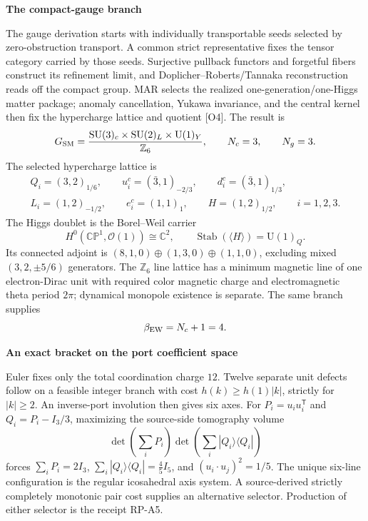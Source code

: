 \documentclass[10pt]{article}
\begin{document}
\vspace{0.14em}
{\bfseries\color{pragmaCyanText}The compact-gauge branch}\par

The gauge derivation starts with individually transportable seeds selected by
zero-obstruction transport. A common strict representative fixes the tensor
category carried by those seeds. Surjective pullback functors and forgetful
fibers construct its refinement limit, and Doplicher--Roberts/Tannaka
reconstruction reads off the compact group. MAR selects the realized
one-generation/one-Higgs matter package; anomaly cancellation, Yukawa
invariance, and the central kernel then fix the hypercharge lattice and quotient
[O4]. The result is
\[
  G_{\rm SM}
  =
  \frac{\mathrm{SU}(3)_c\times\mathrm{SU}(2)_L\times\mathrm{U}(1)_Y}
       {\mathbb Z_6},
  \qquad
  N_c=3,
  \qquad
  N_g=3.
\]
The selected hypercharge lattice is
\[
\begin{gathered}
  Q_i=(3,2)_{1/6},\qquad
  u_i^c=(\bar3,1)_{-2/3},\qquad
  d_i^c=(\bar3,1)_{1/3},\\
  L_i=(1,2)_{-1/2},\qquad
  e_i^c=(1,1)_1,\qquad
  H=(1,2)_{1/2},\qquad i=1,2,3.
\end{gathered}
\]
The Higgs doublet is the Borel--Weil carrier
\[
  H^0(\mathbb{CP}^1,\mathcal O(1))\cong\mathbb C^2,
  \qquad
  \operatorname{Stab}(\langle H\rangle)=\mathrm U(1)_Q.
\]
Its connected adjoint is
\((8,1,0)\oplus(1,3,0)\oplus(1,1,0)\),
excluding mixed \((3,2,\pm5/6)\) generators. The \(\mathbb Z_6\) line lattice
has a minimum magnetic line of one electron-Dirac unit with required color
magnetic charge and electromagnetic theta period \(2\pi\); dynamical monopole
existence is separate. The same branch supplies
\[
  \beta_{\rm EW}=N_c+1=4.
\]

\vspace{0.14em}
{\bfseries\color{pragmaCyanText}An exact bracket on the port coefficient space}\par

Euler fixes only the total coordination charge \(12\). Twelve separate unit
defects follow on a feasible integer branch with cost
\(h(k)\ge h(1)|k|\), strictly for \(|k|\ge2\). An inverse-port involution then
gives six axes. For \(P_i=u_iu_i^{\mathsf T}\) and
\(Q_i=P_i-I_3/3\), maximizing the source-side tomography volume
\[
 \det\!\left(\sum_iP_i\right)
 \det\!\left(\sum_i|Q_i\rangle\langle Q_i|\right)
\]
forces \(\sum_iP_i=2I_3\),
\(\sum_i|Q_i\rangle\langle Q_i|=\tfrac45I_5\), and
\((u_i\!\cdot u_j)^2=1/5\). The unique six-line configuration is the regular
icosahedral axis system. A source-derived strictly completely monotonic pair
cost supplies an alternative selector. Production of either selector is the
receipt \textsc{RP-A5}.
\end{document}
